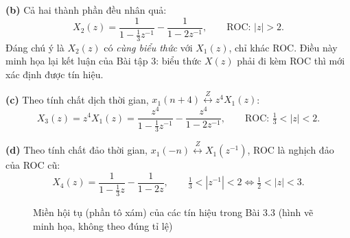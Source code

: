 \documentclass[12pt,a4paper]{article}
\newcommand{\zpair}{\overset{Z}{\longleftrightarrow}}
\begin{document}
\textbf{(b)} Cả hai thành phần đều nhân quả:
\[
    X_2(z) = \frac{1}{1 - \frac{1}{3}z^{-1}} - \frac{1}{1 - 2z^{-1}}, \qquad \text{ROC: } |z| > 2.
\]
Đáng chú ý là $X_2(z)$ có \emph{cùng biểu thức} với $X_1(z)$, chỉ khác ROC. Điều này minh họa lại kết luận của Bài tập 3: biểu thức $X(z)$ phải đi kèm ROC thì mới xác định được tín hiệu.

\textbf{(c)} Theo tính chất dịch thời gian, $x_1(n + 4) \zpair z^4 X_1(z)$:
\[
    X_3(z) = z^4 X_1(z) = \frac{z^4}{1 - \frac{1}{3}z^{-1}} - \frac{z^4}{1 - 2z^{-1}}, \qquad \text{ROC: } \tfrac{1}{3} < |z| < 2.
\]

\textbf{(d)} Theo tính chất đảo thời gian, $x_1(-n) \zpair X_1(z^{-1})$, ROC là nghịch đảo của ROC cũ:
\[
    X_4(z) = \frac{1}{1 - \frac{1}{3}z} - \frac{1}{1 - 2z}, \qquad \tfrac{1}{3} < |z^{-1}| < 2 \iff \tfrac{1}{2} < |z| < 3.
\]

\begin{figure}[H]
    \centering
    \newcommand{\rocaxes}{\draw[->] (-1.9,0) -- (1.9,0) node[right] {\scriptsize Re}; \draw[->] (0,-1.9) -- (0,1.9) node[above] {\scriptsize Im};}
    \hspace{0.5cm}
    \hspace{0.5cm}
    \caption{Miền hội tụ (phần tô xám) của các tín hiệu trong Bài 3.3 (hình vẽ minh họa, không theo đúng tỉ lệ)}
\end{figure}
\end{document}
